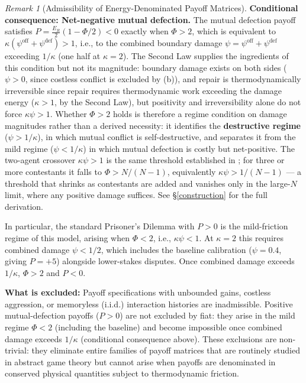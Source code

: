 \documentclass[11pt]{article}
\theoremstyle{plain}
\theoremstyle{definition}
\theoremstyle{remark}
\newtheorem{remark}{Remark}
\begin{document}
\begin{remark}[Admissibility of Energy-Denominated Payoff Matrices]
\textbf{Conditional consequence: Net-negative mutual defection.} The mutual defection payoff satisfies $P = \frac{E_R}{2}(1 - \Phi/2) < 0$ exactly when $\Phi > 2$, which is equivalent to $\kappa(\psi^{\text{off}} + \psi^{\text{def}}) > 1$, i.e., to the combined boundary damage $\psi = \psi^{\text{off}} + \psi^{\text{def}}$ exceeding $1/\kappa$ (one half at $\kappa = 2$). The Second Law supplies the ingredients of this condition but not its magnitude: boundary damage exists on both sides ($\psi > 0$, since costless conflict is excluded by (b)), and repair is thermodynamically irreversible since repair requires thermodynamic work exceeding the damage energy ($\kappa > 1$, by the Second Law), but positivity and irreversibility alone do not force $\kappa\psi > 1$. Whether $\Phi > 2$ holds is therefore a regime condition on damage magnitudes rather than a derived necessity: it identifies the \textbf{destructive regime} ($\psi > 1/\kappa$), in which mutual conflict is self-destructive, and separates it from the mild regime ($\psi < 1/\kappa$) in which mutual defection is costly but net-positive. The two-agent crossover $\kappa\psi > 1$ is the same threshold established in \citep{TC-IV}; for three or more contestants it falls to $\Phi > N/(N-1)$, equivalently $\kappa\psi > 1/(N-1)$ — a threshold that shrinks as contestants are added and vanishes only in the large-$N$ limit, where any positive damage suffices. See §\ref{construction} for the full derivation.

In particular, the standard Prisoner's Dilemma with $P > 0$ is the mild-friction regime of this model, arising when $\Phi < 2$, i.e., $\kappa\psi < 1$. At $\kappa = 2$ this requires combined damage $\psi < 1/2$, which includes the baseline calibration ($\psi = 0.4$, giving $P = +5$) alongside lower-stakes disputes. Once combined damage exceeds $1/\kappa$, $\Phi > 2$ and $P < 0$.

\textbf{What is excluded:} Payoff specifications with unbounded gains, costless aggression, or memoryless (i.i.d.) interaction histories are inadmissible. Positive mutual-defection payoffs ($P > 0$) are not excluded by fiat: they arise in the mild regime $\Phi < 2$ (including the baseline) and become impossible once combined damage exceeds $1/\kappa$ (conditional consequence above). These exclusions are non-trivial: they eliminate entire families of payoff matrices that are routinely studied in abstract game theory but cannot arise when payoffs are denominated in conserved physical quantities subject to thermodynamic friction.
\end{remark}
\end{document}
